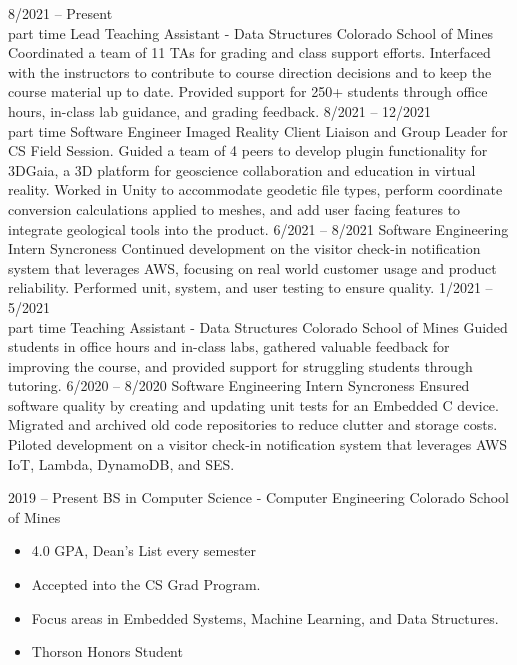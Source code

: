 \documentclass[9pt]{developercv} %
\begin{document}
\begin{entrylist}
	\entry %
		{8/2021 -- Present\\\footnotesize{part time}}
		{Lead Teaching Assistant - Data Structures}
		{Colorado School of Mines}
		{Coordinated a team of 11 TAs for grading and class support efforts. Interfaced with the instructors to 
		contribute to course direction decisions and to keep the course material up to date. Provided support 
		for 250+ students through office hours, in-class lab guidance, and grading feedback.}
	\entry %
		{8/2021 -- 12/2021\\\footnotesize{part time}}
		{Software Engineer}
		{Imaged Reality}
		{Client Liaison and Group Leader for CS Field Session. Guided a team of 4 peers to develop plugin functionality for 3DGaia, 
		a 3D platform for geoscience collaboration and education in virtual reality. Worked in Unity to accommodate geodetic file types, 
		perform coordinate conversion calculations applied to meshes, and add user facing features to integrate geological tools into 
		the product.}
	\entry %
		{6/2021 -- 8/2021}
		{Software Engineering Intern}
		{Syncroness}
		{Continued development on the visitor check-in notification system that leverages AWS, focusing on real world
		customer usage and product reliability. Performed unit, system, and user testing to ensure quality.}
	\entry %
		{1/2021 -- 5/2021\\\footnotesize{part time}}
		{Teaching Assistant - Data Structures}
		{Colorado School of Mines}
		{Guided students in office hours and in-class labs, gathered valuable feedback for improving the course, and 
		provided support for struggling students through tutoring.}
	\entry %
		{6/2020 -- 8/2020}
		{Software Engineering Intern}
		{Syncroness}
		{Ensured software quality by creating and updating unit tests for an Embedded C device.
		Migrated and archived old code repositories to reduce clutter and storage costs.
		Piloted development on a visitor check-in notification system that leverages AWS IoT, Lambda, DynamoDB, and SES.}
\end{entrylist}



\begin{entrylist}
	\entry
		{2019 -- Present}
		{BS in Computer Science - Computer Engineering}
		{Colorado School of Mines}
		{\begin{itemize}[noitemsep, topsep=0pt]
			\item 4.0 GPA, Dean's List every semester
			\item Accepted into the CS Grad Program.
			\item Focus areas in Embedded Systems, Machine Learning, and Data Structures.
			\item Thorson Honors Student
		\end{itemize}}
\end{entrylist}
\end{document}
